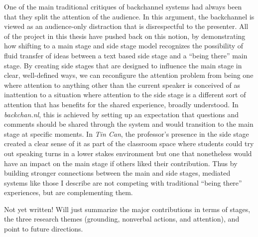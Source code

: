 One of the main traditional critiques of backchannel systems had always been that they split the attention of the audience. In this argument, the backchannel is viewed as an audience-only distraction that is disrespectful to the presenter. All of the project in this thesis have pushed back on this notion, by demonstrating how shifting to a main stage and side stage model recognizes the possibility of fluid transfer of ideas between a text based side stage and a ``being there'' main stage. By creating side stages that are designed to influence the main stage in clear, well-defined ways, we can reconfigure the attention problem from being one where attention to anything other than the current speaker is conceived of as inattention to a situation where attention to the side stage is a different sort of attention that has benefits for the shared experience, broadly understood. In \emph{backchan.nl}, this is achieved by setting up an expectation that questions and comments should be shared through the system and would transition to the main stage at specific moments. In \emph{Tin Can}, the professor's presence in the side stage created a clear sense of it as part of the classroom space where students could try out speaking turns in a lower stakes environment but one that nonetheless would have an impact on the main stage if others liked their contribution. Thus by building stronger connections between the main and side stages, mediated systems like those I describe are not competing with traditional ``being there'' experiences, but are complementing them. 







Not yet written! Will just summarize the major contributions in terms of stages, the three research themes (grounding, nonverbal actions, and attention), and point to future directions.